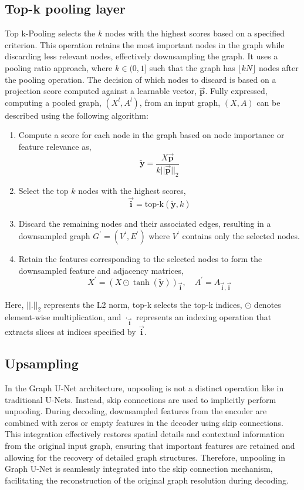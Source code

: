 \subsection{Top-k pooling layer}
Top k-Pooling selects the $k$ nodes with the highest scores based on a specified criterion. This operation retains the most important nodes in the graph while discarding less relevant nodes, effectively downsampling the graph. It uses a pooling ratio approach, where $k \in (0, 1]$ such that the graph has $\lfloor kN \rfloor$ nodes after the pooling operation. The decision of which nodes to discard is based on a projection score computed against a learnable vector, $\mathbf{\overrightarrow{p}}$. Fully expressed, computing a pooled graph, $(X^l, A^l)$, from an input graph, $(X, A)$ can be described using the following algorithm: 
\begin{enumerate}
    \item Compute a score for each node in the graph based on node importance or feature relevance as,
    \[
\mathbf{\tilde{y}} = \frac{X \mathbf{\overrightarrow{p}}}{k||\mathbf{\overrightarrow{p}}||_2} \]
    \item Select the top $k$ nodes with the highest scores, \[ \mathbf{\overrightarrow{i}} = \text{top-k}(\mathbf{\tilde{y}}, k) \]
    \item Discard the remaining nodes and their associated edges, resulting in a downsampled graph $G^{\prime} = (V^{\prime}, E^{\prime})$ where $V^{\prime}$ contains only the selected nodes.
    \item Retain the features corresponding to the selected nodes to form the downsampled feature and adjacency matrices, \[
        X^{\prime} = (X \odot \tanh(\mathbf{\tilde{y}}))_{\mathbf{\overrightarrow{i}}}, \quad A^{\prime} = A_{\mathbf{\overrightarrow{i}},\mathbf{\overrightarrow{i}}}
       \]
\end{enumerate}
Here, $||.||_2$ represents the L2 norm, top-k selects the top-k indices, $\odot$ denotes element-wise multiplication, and $\cdot_{\mathbf{\overrightarrow{i}}}$ represents an indexing operation that extracts slices at indices specified by $\mathbf{\overrightarrow{i}}$. 
\subsection{Upsampling}
In the Graph U-Net architecture, unpooling is not a distinct operation like in traditional U-Nets. Instead, skip connections are used to implicitly perform unpooling. During decoding, downsampled features from the encoder are combined with zeros or empty features in the decoder using skip connections. This integration effectively restores spatial details and contextual information from the original input graph, ensuring that important features are retained and allowing for the recovery of detailed graph structures. Therefore, unpooling in Graph U-Net is seamlessly integrated into the skip connection mechanism, facilitating the reconstruction of the original graph resolution during decoding.
